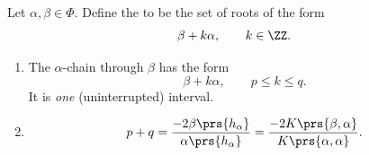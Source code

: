 \documentclass[10pt,a4paper,twoside,openany,hidelinks]{book}
\begin{document}
\begin{definition}
Let $\alpha,\beta \in \Phi$. Define the  to be the set of roots of the form \[\beta + k \alpha, \qquad k \in \ZZ\text{.}\]
\end{definition}

\begin{theorem}
\begin{enumerate}
\item The $\alpha$-chain through $\beta$ has the form
\[\beta + k\alpha, \qquad p \leq k \leq q \text{.}\]
It is \emph{one} (uninterrupted) interval.

\item
\[p+q = \frac{-2\beta\prs{h_{\alpha}}}{\alpha\prs{h_{\alpha}}} = \frac{-2 K\prs{\beta,\alpha}}{K\prs{\alpha,\alpha}}\text{.}\]
\end{enumerate}
\end{theorem}
\end{document}
